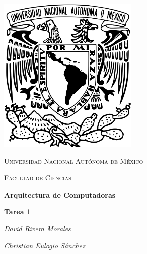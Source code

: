 \begin{titlepage}
    \centering
    \includegraphics[width=0.50\textwidth]{unam_logo.png}\par
    \vspace{1cm}
    {\scshape\Large Universidad Nacional Autónoma de México \par}
    \vspace{1cm}
    {\scshape\Large Facultad de Ciencias \par}
    \vspace{1.5cm}
    {\huge\bfseries Arquitectura de Computadoras \par}
    {\huge\bfseries Tarea 1 \par}
    \vspace{2cm}
    {\Large\itshape David Rivera Morales\par}
    {\Large \itshape Christian Eulogio Sánchez \par}
    \vfill
  
\end{titlepage}

